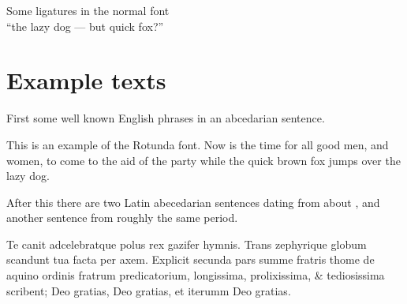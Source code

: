 \documentclass{article}
\newcommand{\Romannum}[1]{\uppercase\expandafter{\romannumeral #1}}
\newcommand{\Sentence}{%
This is an example of the Rotunda font. Now is the time for all good
men, and women, to come to the aid of the party while the quick brown fox
jumps over the lazy dog.}
\newcommand{\latin}{Te canit adcelebratque polus rex gazifer hymnis.
  Trans zephyrique globum scandunt tua facta per axem.
  Explicit secunda pars summe fratris thome de aquino ordinis fratrum 
  predicatorium, longissima, prolixissima, \& tediosissima scribent;
  Deo gratias, Deo gratias, et iterumm Deo gratias. }
\begin{document}
\begin{center}
    Some ligatures in the normal font \\
{``the lazy dog --- but quick fox?''}
\end{center}

\section{Example texts}

    First some well known English phrases in an abcedarian sentence.

\Sentence{}

    After this there are two Latin abecedarian sentences dating from about 
\Romannum{790}, and another sentence from roughly the same period.

\latin{}

    
\end{document}
